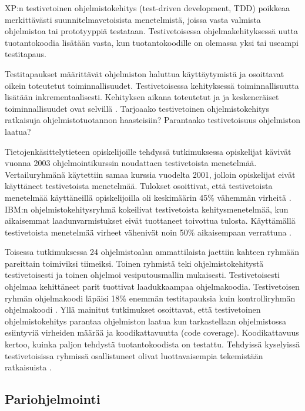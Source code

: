 \documentclass[finnish]{tktltiki2}
\theoremstyle{definition}
\theoremstyle{remark}
\begin{document}
{XP:n testivetoinen ohjelmistokehitys (test-driven development, TDD) poikkeaa merkittävästi suunnitelmavetoisista menetelmistä, joissa vasta valmista ohjelmistoa tai prototyyppiä testataan. Testivetoisessa ohjelmakehityksessä uutta tuotantokoodia lisätään vasta, kun tuotantokoodille on olemassa yksi tai useampi testitapaus.

Testitapaukset määrittävät ohjelmiston haluttua käyttäytymistä ja osoittavat oikein toteutetut toiminnallisuudet. Testivetoisessa kehityksessä toiminnallisuutta lisätään inkrementaalisesti. Kehityksen aikana toteutetut ja ja keskeneräiset toiminnallisuudet ovat selvillä \cite{EDW03}.
Tarjoaako testivetoinen ohjelmistokehitys ratkaisuja ohjelmistotuotannon haasteisiin? Parantaako testivetoisuus ohjelmiston laatua?

Tietojen\-käsittely\-tieteen opiskelijoille tehdyssä tutkimuksessa opiskelijat kävivät vuonna 2003 ohjelmointikurssin noudattaen testivetoista menetelmää. Vertailuryhmänä käytettiin samaa kurssia vuodelta 2001, jolloin opiskelijat eivät käyttäneet testivetoista menetelmää. Tulokset osoittivat, että testivetoista menetelmää käyttäneillä opiskelijoilla oli keskimäärin 45\% vähemmän virheitä \cite{EDW03}.
IBM:n ohjelmistokehitysryhmä kokeilivat testivetoista kehitysmenetelmää, kun aikaisemmat laadunvarmistukset eivät tuottaneet toivottua tulosta. Käyttämällä testivetoista menetelmää virheet vähenivät noin 50\% aikaisempaan verrattuna \cite{MAW03}.

Toisessa tutkimuksessa 24 ohjelmistoalan ammattilaista jaettiin kahteen ryhmään pareittain toimiviksi tiimeiksi. Toinen ryhmistä teki ohjelmistokehitystä testivetoisesti ja toinen ohjelmoi vesiputousmallin mukaisesti. Testivetoisesti ohjelmaa kehittäneet parit tuottivat laadukkaampaa ohjelmakoodia. Testivetoisen ryhmän ohjelmakoodi läpäisi 18\% enemmän testitapauksia kuin kontrolliryhmän ohjelmakoodi \cite{GEW03}.
Yllä mainitut tutkimukset osoittavat, että testivetoinen ohjelmistokehitys parantaa ohjelmiston laatua kun tarkastellaan ohjelmistossa esiintyviä virheiden määrää ja koodikattavuutta (code coverage). Koodikattavuus kertoo, kuinka paljon tehdystä tuotantokoodista on testattu. Tehdyissä kyselyissä testivetoisissa ryhmissä osallistuneet olivat luottavaisempia tekemistään ratkaisuista \cite{GEW03}.

\subsection{Pariohjelmointi}

}
\end{document}
